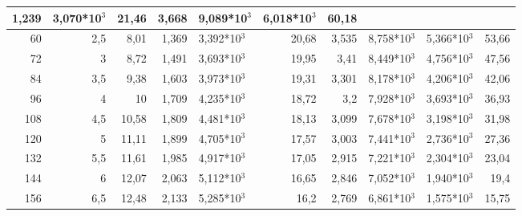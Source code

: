 \begin{table}[H]
{\begin{tabular}{|rr|rrl|rrl|l|r|}
  \multicolumn{1}{r|}{1,239} &
  3,070*10$^3$ &
  \multicolumn{1}{r|}{21,46} &
  \multicolumn{1}{r|}{3,668} &
  9,089*10$^3$ &
  6,018*10$^3$ &
  60,18 \\ \hline
\multicolumn{1}{|r|}{60} &
  2,5 &
  \multicolumn{1}{r|}{8,01} &
  \multicolumn{1}{r|}{1,369} &
  3,392*10$^3$ &
  \multicolumn{1}{r|}{20,68} &
  \multicolumn{1}{r|}{3,535} &
  8,758*10$^3$ &
  5,366*10$^3$ &
  53,66 \\ \hline
\multicolumn{1}{|r|}{72} &
  3 &
  \multicolumn{1}{r|}{8,72} &
  \multicolumn{1}{r|}{1,491} &
  3,693*10$^3$ &
  \multicolumn{1}{r|}{19,95} &
  \multicolumn{1}{r|}{3,41} &
  8,449*10$^3$ &
  4,756*10$^3$ &
  47,56 \\ \hline
\multicolumn{1}{|r|}{84} &
  3,5 &
  \multicolumn{1}{r|}{9,38} &
  \multicolumn{1}{r|}{1,603} &
  3,973*10$^3$ &
  \multicolumn{1}{r|}{19,31} &
  \multicolumn{1}{r|}{3,301} &
  8,178*10$^3$ &
  4,206*10$^3$ &
  42,06 \\ \hline
\multicolumn{1}{|r|}{96} &
  4 &
  \multicolumn{1}{r|}{10} &
  \multicolumn{1}{r|}{1,709} &
  4,235*10$^3$ &
  \multicolumn{1}{r|}{18,72} &
  \multicolumn{1}{r|}{3,2} &
  7,928*10$^3$ &
  3,693*10$^3$ &
  36,93 \\ \hline
\multicolumn{1}{|r|}{108} &
  4,5 &
  \multicolumn{1}{r|}{10,58} &
  \multicolumn{1}{r|}{1,809} &
  4,481*10$^3$ &
  \multicolumn{1}{r|}{18,13} &
  \multicolumn{1}{r|}{3,099} &
  7,678*10$^3$ &
  3,198*10$^3$ &
  31,98 \\ \hline
\multicolumn{1}{|r|}{120} &
  5 &
  \multicolumn{1}{r|}{11,11} &
  \multicolumn{1}{r|}{1,899} &
  4,705*10$^3$ &
  \multicolumn{1}{r|}{17,57} &
  \multicolumn{1}{r|}{3,003} &
  7,441*10$^3$ &
  2,736*10$^3$ &
  27,36 \\ \hline
\multicolumn{1}{|r|}{132} &
  5,5 &
  \multicolumn{1}{r|}{11,61} &
  \multicolumn{1}{r|}{1,985} &
  4,917*10$^3$ &
  \multicolumn{1}{r|}{17,05} &
  \multicolumn{1}{r|}{2,915} &
  7,221*10$^3$ &
  2,304*10$^3$ &
  23,04 \\ \hline
\multicolumn{1}{|r|}{144} &
  6 &
  \multicolumn{1}{r|}{12,07} &
  \multicolumn{1}{r|}{2,063} &
  5,112*10$^3$ &
  \multicolumn{1}{r|}{16,65} &
  \multicolumn{1}{r|}{2,846} &
  7,052*10$^3$ &
  1,940*10$^3$ &
  19,4 \\ \hline
\multicolumn{1}{|r|}{156} &
  6,5 &
  \multicolumn{1}{r|}{12,48} &
  \multicolumn{1}{r|}{2,133} &
  5,285*10$^3$ &
  \multicolumn{1}{r|}{16,2} &
  \multicolumn{1}{r|}{2,769} &
  6,861*10$^3$ &
  1,575*10$^3$ &
  15,75 \\ \hline

\end{tabular}}
\end{table}
